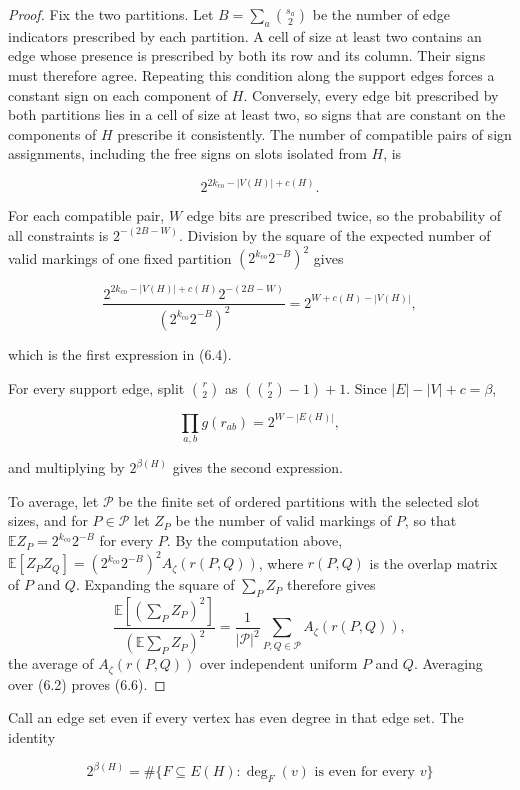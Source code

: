 \documentclass[a4paper,10pt,reqno]{amsart}
\numberwithin{equation}{section}
\theoremstyle{plain}
\theoremstyle{remark}
\begin{document}
\begin{proof}
Fix the two partitions. Let \(B=\sum_a \binom{s_a}{2}\) be the number of
edge indicators prescribed by each partition. A cell of size at least
two contains an edge whose presence is prescribed by both its row and its
column. Their signs must therefore agree. Repeating this condition along
the support edges forces a constant sign on each component of \(H\).
Conversely, every edge bit prescribed by both partitions lies in a cell of
size at least two, so signs that are constant on the components of \(H\)
prescribe it consistently. The number of compatible pairs
of sign assignments, including the free signs on slots isolated from $H$, is

\[
 2^{2k_{\mathrm{co}}-|V(H)|+c(H)}.
\]

For each compatible pair, \(W\) edge bits are prescribed twice, so the
probability of all constraints is
\(2^{-(2B-W)}\). Division by the square of the expected number
of valid markings of one fixed partition
\((2^{k_{\mathrm{co}}}2^{-B})^2\)
gives

\[
 \frac{2^{2k_{\mathrm{co}}-|V(H)|+c(H)}2^{-(2B-W)}}
      {(2^{k_{\mathrm{co}}}2^{-B})^2}
 =2^{W+c(H)-|V(H)|},
\]

which is the first expression in (6.4).

For every support edge, split \(\binom{r}{2}\) as
\((\binom{r}{2}-1)+1\). Since
\(|E|-|V|+c=\beta\),

\[
 \prod_{a,b}g(r_{ab})=2^{W-|E(H)|},
\]

and multiplying by \(2^{\beta(H)}\) gives
the second expression.

To average, let $\mathcal P$ be the finite set of ordered partitions with
the selected slot sizes, and for $P\in\mathcal P$ let $Z_P$ be the number
of valid markings of $P$, so that $\mathbb E Z_P=2^{k_{\mathrm{co}}}2^{-B}$
for every $P$. By the computation above,
$\mathbb E[Z_PZ_Q]=(2^{k_{\mathrm{co}}}2^{-B})^2A_\zeta(r(P,Q))$, where
$r(P,Q)$ is the overlap matrix of $P$ and $Q$. Expanding the square of
$\sum_PZ_P$ therefore gives
\[
 \frac{\mathbb E[(\sum_PZ_P)^2]}{(\mathbb E\sum_PZ_P)^2}
 =\frac1{|\mathcal P|^2}\sum_{P,Q\in\mathcal P}A_\zeta(r(P,Q)),
\]
the average of $A_\zeta(r(P,Q))$ over independent uniform $P$ and $Q$.
Averaging over (6.2) proves (6.6).
\end{proof}

Call an edge set even if every vertex has even degree in that edge set.
The identity

\[
 2^{\beta(H)}
 =\#\{F\subseteq E(H):\deg_F(v)\text{ is even for every }v\} \tag{6.7}
\]
\end{document}
